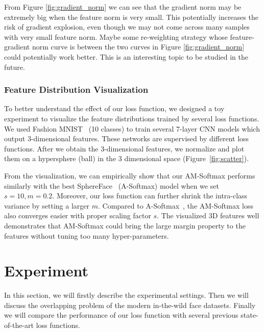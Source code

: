\documentclass[10pt,twocolumn,letterpaper]{article}
\begin{document}
From Figure \ref{fig:gradient_norm} we can see that the gradient norm may be extremely big when the feature norm is very small. This potentially increases the risk of gradient explosion, even though we may not come across many samples with very small feature norm. Maybe some re-weighting strategy whose feature-gradient norm curve is between the two curves in Figure \ref{fig:gradient_norm} could potentially work better. This is an interesting topic to be studied in the future.

\subsubsection{Feature Distribution Visualization}

To better understand the effect of our loss function, we designed a toy experiment to visualize the feature distributions trained by several loss functions. We used Fashion MNIST~\cite{xiao2017fashion} (10 classes) to train several 7-layer CNN models which output 3-dimensional features. These networks are supervised by different loss functions. After we obtain the 3-dimensional features, we normalize and plot them on a hypersphere (ball) in the 3 dimensional space (Figure~\ref{fig:scatter}). 

From the visualization, we can empirically show that our AM-Softmax performs similarly with the best SphereFace~\cite{liu2017sphereface} (A-Softmax) model when we set $s=10, m=0.2$. Moreover, our loss function can further shrink the intra-class variance by setting a larger $m$. Compared to A-Softmax~\cite{liu2017sphereface}, the AM-Softmax loss also converges easier with proper scaling factor $s$. The visualized 3D features well demonstrates that AM-Softmax could bring the large margin property to the features without tuning too many hyper-parameters.






\section{Experiment}

In this section, we will firstly describe the experimental settings. Then we will discuss the overlapping problem of the modern in-the-wild face datasets. Finally we will compare the performance of our loss function with several previous state-of-the-art loss functions.
\end{document}
